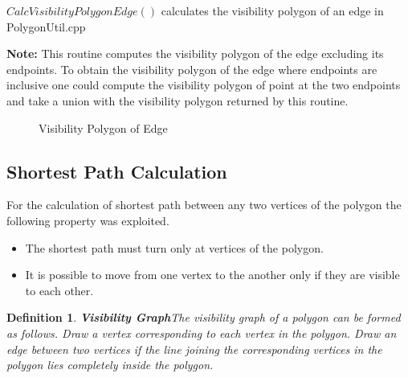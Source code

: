 \documentclass[a4paper,10pt]{article}
\newtheorem{definition}[theorem]{Definition}
\begin{document}
 $CalcVisibilityPolygonEdge()$ calculates the visibility polygon of an edge in PolygonUtil.cpp

{\bf Note:}
This routine computes the visibility polygon of the edge excluding its endpoints. To obtain the visibility polygon of the edge where
endpoints are inclusive one could compute the visibility polygon of point at the two endpoints and take a union with the visibility
polygon returned by this routine.

\begin{figure}[h]
\begin{center}
\caption{\label{fig:Visibility Polygon of Edge}Visibility Polygon of Edge}
\end{center}
\end{figure}



\subsection{Shortest Path Calculation}
For the calculation of shortest path between any two vertices of the polygon the following property was exploited.
\begin{itemize}
 \item The shortest path must turn only at vertices of the polygon.
 \item It is possible to move from one vertex to the another only if they are visible to each other.
\end{itemize}

\begin{definition}
{\bf Visibility Graph}The visibility graph of a polygon can be formed as follows. Draw a vertex corresponding to each vertex in the 
polygon. Draw an edge between two vertices if the line joining the corresponding vertices in the polygon lies completely inside the 
polygon.
\end{definition}
\end{document}
